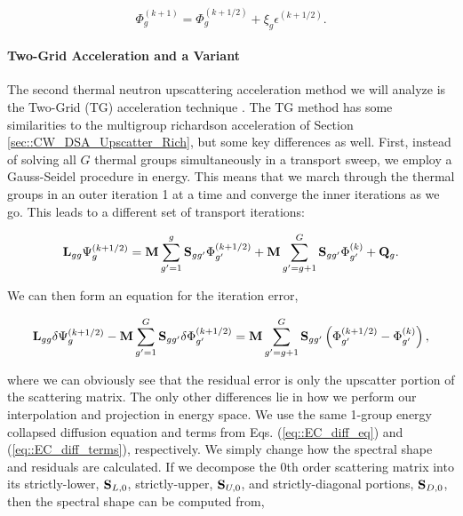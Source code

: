 \documentclass[11pt]{article}
\begin{document}
\begin{equation}
\label{eq::rich_update}
\Phi_g^{(k+1)} =  \Phi_g^{(k+1/2)} + \xi_g  \epsilon^{(k+1/2)}.
\end{equation}

\paragraph{Two-Grid Acceleration and a Variant}
\label{sec::CW_DSA_Upscatter_TG}

The second thermal neutron upscattering acceleration method we will analyze is the Two-Grid (TG) acceleration technique \cite{adams1993two}. The TG method has some similarities to the multigroup richardson acceleration of Section \ref{sec::CW_DSA_Upscatter_Rich}, but some key differences as well. First, instead of solving all $G$ thermal groups simultaneously in a transport sweep, we employ a Gauss-Seidel procedure in energy. This means that we march through the thermal groups in an outer iteration 1 at a time and converge the inner iterations as we go. This leads to a different set of transport iterations:

\begin{equation}
\label{eq::GS_it}
{\bf L}_{gg} \Psi_g^{(k+1/2)} = {\bf M} \sum_{g'=1}^g {\bf S}_{g g'} \Phi_{g'}^{(k+1/2)} + {\bf M} \sum_{g'=g+1}^G {\bf S}_{g g'} \Phi_{g'}^{(k)} + {\bf Q}_g .
\end{equation}

We can then form an equation for the iteration error,

\begin{equation}
\label{eq::TG_full_eq_err}
{\bf L}_{gg} \delta \Psi_g^{(k+1/2)} - {\bf M} \sum_{g'=1}^G {\bf S}_{g g'} \delta \Phi_{g'}^{(k+1/2)}=  {\bf M} \sum_{g'=g+1}^G {\bf S}_{g g'}\left( \Phi_{g'}^{(k+1/2)}- \Phi_{g'}^{(k)} \right) ,
\end{equation}

\noindent where we can obviously see that the residual error is only the upscatter portion of the scattering matrix. The only other differences lie in how we perform our interpolation and projection in energy space. We use the same 1-group energy collapsed diffusion equation and terms from Eqs. (\ref{eq::EC_diff_eq}) and (\ref{eq::EC_diff_terms}), respectively. We simply change how the spectral shape and residuals are calculated. If we decompose the 0th order scattering matrix into its strictly-lower, ${\bf S}_{L,0}$, strictly-upper, ${\bf S}_{U,0}$, and strictly-diagonal portions, ${\bf S}_{D,0}$, then the spectral shape can be computed from,
\end{document}
